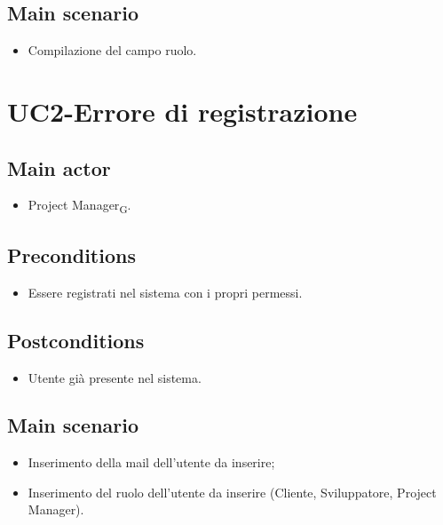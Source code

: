 \documentclass{article}
\begin{document}
        \subsection*{Main scenario}
        \begin{itemize}
        \item Compilazione del campo ruolo.
        \end{itemize}

\section{UC2-Errore di registrazione}
    \subsection*{Main actor}
         \begin{itemize}
             \item Project Manager\textsubscript{G}.
         \end{itemize}
         
     \subsection*{Preconditions} 
        \begin{itemize}
            \item Essere registrati nel sistema con i propri permessi.
        \end{itemize}
        
    \subsection*{Postconditions}
        \begin{itemize}
            \item Utente già presente nel sistema.
        \end{itemize}
        \subsection*{Main scenario}
        \begin{itemize}
        \item Inserimento della mail dell'utente da inserire;
        \item Inserimento del ruolo dell'utente da inserire (Cliente, Sviluppatore, Project Manager).
        \end{itemize}
\end{document}
